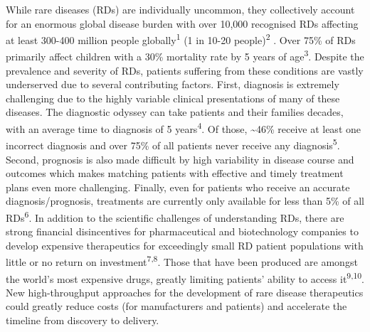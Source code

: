 \documentclass[
]{article}
\begin{document}
While rare diseases (RDs) are individually uncommon, they collectively
account for an enormous global disease burden with over 10,000
recognised RDs affecting at least 300-400 million people
globally\textsuperscript{1} (1 in 10-20 people)\textsuperscript{2} .
Over 75\% of RDs primarily affect children with a 30\% mortality rate by
5 years of age\textsuperscript{3}. Despite the prevalence and severity
of RDs, patients suffering from these conditions are vastly underserved
due to several contributing factors. First, diagnosis is extremely
challenging due to the highly variable clinical presentations of many of
these diseases. The diagnostic odyssey can take patients and their
families decades, with an average time to diagnosis of 5
years\textsuperscript{4}. Of those, \textasciitilde46\% receive at least
one incorrect diagnosis and over 75\% of all patients never receive any
diagnosis\textsuperscript{5}. Second, prognosis is also made difficult
by high variability in disease course and outcomes which makes matching
patients with effective and timely treatment plans even more
challenging. Finally, even for patients who receive an accurate
diagnosis/prognosis, treatments are currently only available for less
than 5\% of all RDs\textsuperscript{6}. In addition to the scientific
challenges of understanding RDs, there are strong financial
disincentives for pharmaceutical and biotechnology companies to develop
expensive therapeutics for exceedingly small RD patient populations with
little or no return on investment\textsuperscript{7,8}. Those that have
been produced are amongst the world's most expensive drugs, greatly
limiting patients' ability to access it\textsuperscript{9,10}. New
high-throughput approaches for the development of rare disease
therapeutics could greatly reduce costs (for manufacturers and patients)
and accelerate the timeline from discovery to delivery.
\end{document}
